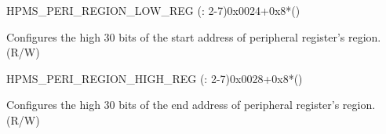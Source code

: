 {    \begin{register}{H}{PMS\_PERI\_REGION\_LOW\_REG (: 2-7)}{0x0024+0x8*()}\label{regdesc:PMSPERIREGIONMLOWREG}
    \regnewline%
    \begin{regdesc}\begin{reglist}
    \label{fielddesc:PMSPERIREGIONMLOW}\item [PMS\_PERI\_REGION\regindex{m}\_LOW] Configures the high 30 bits of the start address of peripheral register's region. (R/W)
    \end{reglist}\end{regdesc}
    \end{register}


    \begin{register}{H}{PMS\_PERI\_REGION\_HIGH\_REG (: 2-7)}{0x0028+0x8*()}\label{regdesc:PMSPERIREGIONMHIGHREG}
    \regnewline%
    \begin{regdesc}\begin{reglist}
    \label{fielddesc:PMSPERIREGIONMHIGH}\item [PMS\_PERI\_REGION\regindex{m}\_HIGH] Configures the high 30 bits of the end address of peripheral register's region. (R/W)
    \end{reglist}\end{regdesc}
    \end{register}
}